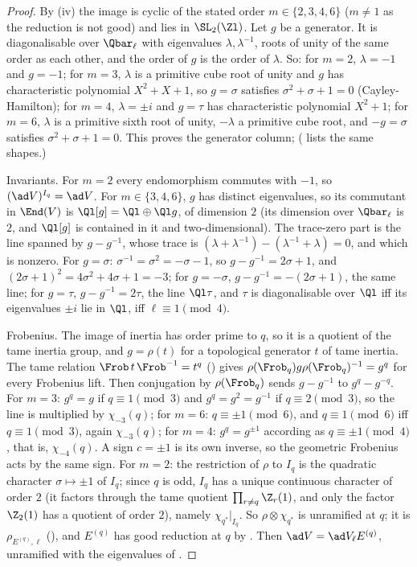 \begin{proof}
By (iv) the image is cyclic of the stated order $m\in\{2,3,4,6\}$ ($m\ne1$ as the reduction is not good) and lies in
$\SL_2(\Zl)$. Let $g$ be a generator. It is diagonalisable over $\Qbar_\ell$ with eigenvalues $\lambda,\lambda^{-1}$, roots of unity of the same order as
each other, and the order of $g$ is the order of $\lambda$. So: for $m=2$, $\lambda=-1$ and $g=-1$; for $m=3$, $\lambda$ is a primitive cube root of
unity and $g$ has characteristic polynomial $X^2+X+1$, so $g=\sigma$ satisfies $\sigma^2+\sigma+1=0$ (Cayley-Hamilton); for $m=4$, $\lambda=\pm i$ and $g=\tau$
has characteristic polynomial $X^2+1$; for $m=6$, $\lambda$ is a primitive sixth root of unity, $-\lambda$ a primitive cube root, and $-g=\sigma$
satisfies $\sigma^2+\sigma+1=0$. This proves the generator column; ( lists the same shapes.)

Invariants. For $m=2$ every endomorphism commutes with $-1$, so $(\ad V)^{I_q}=\ad V$. For $m\in\{3,4,6\}$, $g$ has distinct eigenvalues, so its
commutant in $\End(V)$ is $\Ql[g]=\Ql\oplus\Ql g$, of dimension $2$ (its dimension over $\Qbar_\ell$ is $2$, and $\Ql[g]$ is contained in it and
two-dimensional). The trace-zero part is the line spanned by $g-g^{-1}$, whose trace is $(\lambda+\lambda^{-1})-(\lambda^{-1}+\lambda)=0$, and which is nonzero. For
$g=\sigma$: $\sigma^{-1}=\sigma^2=-\sigma-1$, so $g-g^{-1}=2\sigma+1$, and $(2\sigma+1)^2=4\sigma^2+4\sigma+1=-3$; for $g=-\sigma$, $g-g^{-1}=-(2\sigma+1)$, the same line;
for $g=\tau$, $g-g^{-1}=2\tau$, the line $\Ql\tau$, and $\tau$ is diagonalisable over $\Ql$ iff its eigenvalues $\pm i$ lie in $\Ql$, iff $\ell\equiv1\pmod4$.

Frobenius. The image of inertia has order prime to $q$, so it is a quotient of the tame inertia group, and $g=\rho(t)$ for a topological
generator $t$ of tame inertia. The tame relation $\Frob\,t\,\Frob^{-1}=t^q$ () gives $\rho(\Frob_q)g\rho(\Frob_q)^{-1}=g^q$ for every Frobenius lift.
Then conjugation by $\rho(\Frob_q)$ sends $g-g^{-1}$ to $g^q-g^{-q}$. For $m=3$: $g^q=g$ if $q\equiv1\pmod3$ and $g^q=g^2=g^{-1}$ if $q\equiv2\pmod3$, so the line is
multiplied by $\chi_{-3}(q)$; for $m=6$: $q\equiv\pm1\pmod6$, and $q\equiv1\pmod6$ iff $q\equiv1\pmod3$, again $\chi_{-3}(q)$; for $m=4$: $g^q=g^{\pm1}$ according as
$q\equiv\pm1\pmod4$, that is, $\chi_{-4}(q)$. A sign $c=\pm1$ is its own inverse, so the geometric Frobenius acts by the same sign. For $m=2$: the
restriction of $\rho$ to $I_q$ is the quadratic character $\sigma\mapsto\pm1$ of $I_q$; since $q$ is odd, $I_q$ has a unique continuous character of order
$2$ (it factors through the tame quotient $\prod_{r\ne q}\Z_r(1)$, and only the factor $\Z_2(1)$ has a quotient of order $2$), namely
$\chi_{q^*}|_{I_q}$. So $\rho\otimes\chi_{q^*}$ is unramified at $q$; it is $\rho_{E^{(q)},\ell}$ (), and $E^{(q)}$ has good
reduction at $q$ by . Then $\ad V=\ad V_\ell E^{(q)}$, unramified with the eigenvalues of .


\end{proof}
